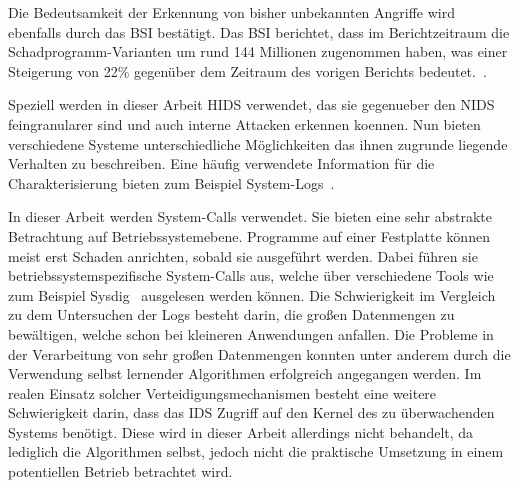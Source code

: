 Die Bedeutsamkeit der Erkennung von bisher unbekannten Angriffe wird ebenfalls durch das \ac{BSI} bestätigt.
Das \ac{BSI} berichtet, dass im Berichtzeitraum die Schadprogramm-Varianten um rund 144 Millionen zugenommen haben, was einer Steigerung von 22\% gegenüber dem Zeitraum des vorigen Berichts bedeutet.~\cite{BSI}.


%


Speziell werden in dieser Arbeit \ac{HIDS} verwendet, das sie gegenueber den \ac{NIDS} feingranularer sind und auch interne Attacken erkennen koennen.
Nun bieten verschiedene Systeme unterschiedliche Möglichkeiten das ihnen zugrunde liegende Verhalten zu beschreiben. 
Eine häufig verwendete Information für die Charakterisierung bieten zum Beispiel System-Logs~\cite{HE}.

In dieser Arbeit werden System-Calls verwendet.
Sie bieten eine sehr abstrakte Betrachtung auf Betriebssystemebene.
Programme auf einer Festplatte können meist erst Schaden anrichten, sobald sie ausgeführt werden.
Dabei führen sie betriebssystemspezifische System-Calls aus, welche über verschiedene Tools wie zum Beispiel Sysdig~\cite{SYSDIG} ausgelesen werden können.
Die Schwierigkeit im Vergleich zu dem Untersuchen der Logs besteht darin, die großen Datenmengen zu bewältigen, welche schon bei kleineren Anwendungen anfallen.
Die Probleme in der Verarbeitung von sehr großen Datenmengen konnten unter anderem durch die Verwendung selbst lernender Algorithmen erfolgreich angegangen werden.
Im realen Einsatz solcher Verteidigungsmechanismen besteht eine weitere Schwierigkeit darin, dass das \ac{IDS} Zugriff auf den Kernel des zu überwachenden Systems benötigt.
Diese wird in dieser Arbeit allerdings nicht behandelt, da lediglich die Algorithmen selbst, jedoch nicht die praktische Umsetzung in einem potentiellen Betrieb betrachtet wird.

